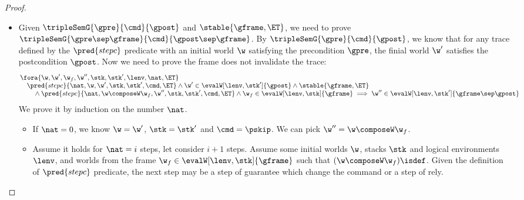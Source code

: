 \begin{proof}
\begin{itemize}
\item {}
Given \( \tripleSemG{\gpre}{\cmd}{\gpost} \) and \( \stable{\gframe, \ET}\), we need to prove \( \tripleSemG{\gpre \sep \gframe }{\cmd}{\gpost \sep \gframe } \).
By \( \tripleSemG{\gpre}{\cmd}{\gpost} \), we know that for any trace defined by the \( \pred{stepc} \) predicate with an initial world \( \w \) satisfying the precondition \( \gpre \), the finial world \( \w' \) satisfies the postcondition \( \gpost \). 
Now we need to prove the frame does not invalidate the trace:
\[
\begin{array}[t]{@{}l}
    \fora{ \w,\w', \w_{f}, \w'', \stk, \stk', \lenv, \nat, \ET } \\
    \quad \pred{stepc}{\nat, \w, \w', \stk, \stk', \cmd, \ET} 
    \land \w' \in \evalW[\lenv, \stk']{\gpost}  
    \land \stable{\gframe, \ET} \\
    \qquad {} \land \pred{stepc}{\nat, \w \composeW \w_f, \w'', \stk, \stk', \cmd, \ET} 
    \land \w_f \in \evalW[\lenv, \stk]{\gframe} 
    \implies \w'' \in \evalW[\lenv, \stk']{\gframe \sep \gpost}
\end{array}
\]
We prove it by induction on the number \( \nat \).
\begin{itemize}
\item If \( \nat = 0 \),  we know \( \w = \w'\), \( \stk = \stk'\) and \( \cmd = \pskip \).
We can pick \( \w'' = \w \composeW \w_f\).

\item Assume it holds for \( \nat = i \) steps, let consider \( i + 1 \) steps.
Assume some initial worlds \( \w \), stacks \( \stk \) and logical environments \( \lenv \), and worlds from the frame \( \w_f \in \evalW[\lenv, \stk]{\gframe}\) such that \( (\w \composeW \w_f)\isdef \).
Given the definition of \( \pred{stepc}\) predicate, the next step may be a step of guarantee which change the command or a step of rely.

\begin{itemize}


\end{itemize}
\end{itemize}
\end{itemize}
\end{proof}
